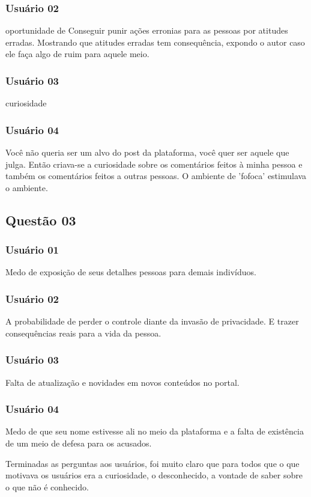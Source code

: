 \subsubsection{Usuário 02}
oportunidade de Conseguir punir ações erronias para as pessoas por atitudes erradas.
Mostrando que atitudes erradas tem consequência, expondo o autor caso ele faça
algo de ruim para aquele meio.
\subsubsection{Usuário 03}
curiosidade
\subsubsection{Usuário 04}
Você não queria ser um alvo do post da plataforma, você quer ser aquele que julga.
Então criava-se a curiosidade sobre os comentários feitos à minha pessoa e também
os comentários feitos a outras pessoas. O ambiente de 'fofoca' estimulava o ambiente.

\subsection{Questão 03}
\subsubsection{Usuário 01}
Medo de exposição de seus detalhes pessoas para demais indivíduos.
\subsubsection{Usuário 02}
A probabilidade de perder o controle diante da invasão de privacidade. E trazer
consequências reais para a vida da pessoa.
\subsubsection{Usuário 03}
Falta de atualização e novidades em novos conteúdos no portal.
\subsubsection{Usuário 04}
Medo de que seu nome estivesse ali no meio da plataforma e a falta de existência
de um meio de defesa para os acusados.

Terminadas as perguntas aos usuários, foi muito claro que para todos que o que motivava
os usuários era a curiosidade, o desconhecido, a vontade de saber sobre o que
não é conhecido.

